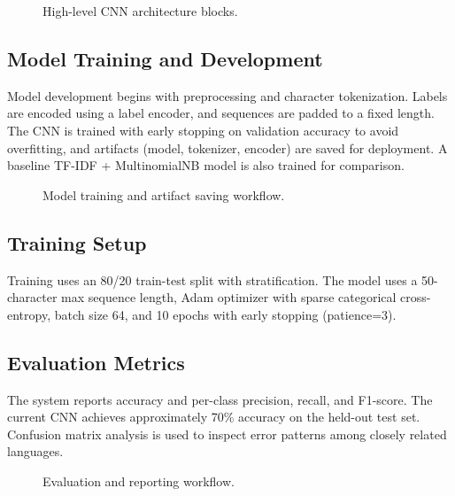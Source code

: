 \documentclass[conference]{IEEEtran}
\begin{document}
\begin{figure}[htbp]
\centering
{}
\caption{High-level CNN architecture blocks.}
\label{fig:cnn-blocks}
\end{figure}

\subsection{Model Training and Development}
Model development begins with preprocessing and character tokenization. Labels are encoded using a label encoder, and sequences are padded to a fixed length. The CNN is trained with early stopping on validation accuracy to avoid overfitting, and artifacts (model, tokenizer, encoder) are saved for deployment. A baseline TF-IDF + MultinomialNB model is also trained for comparison.

\begin{figure}[htbp]
\centering
{}
\caption{Model training and artifact saving workflow.}
\label{fig:training-flow}
\end{figure}

\subsection{Training Setup}
Training uses an 80/20 train-test split with stratification. The model uses a 50-character max sequence length, Adam optimizer with sparse categorical cross-entropy, batch size 64, and 10 epochs with early stopping (patience=3).

\subsection{Evaluation Metrics}
The system reports accuracy and per-class precision, recall, and F1-score. The current CNN achieves approximately 70\% accuracy on the held-out test set. Confusion matrix analysis is used to inspect error patterns among closely related languages.

\begin{figure}[htbp]
\centering
{}
\caption{Evaluation and reporting workflow.}
\label{fig:eval-flow}
\end{figure}
\end{document}
